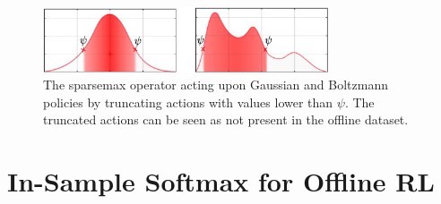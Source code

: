 \documentclass{article}
\begin{document}
\begin{figure}[h]
    \centering
    \includegraphics[width=0.75\textwidth]{img/policy_truncate.png}
    \caption{The sparsemax operator acting upon Gaussian and Boltzmann policies by truncating actions with values lower than $\psi$. 
    The truncated actions can be seen as not present in the offline dataset.
    }
\end{figure}


\section{In-Sample Softmax for Offline RL}
\end{document}
